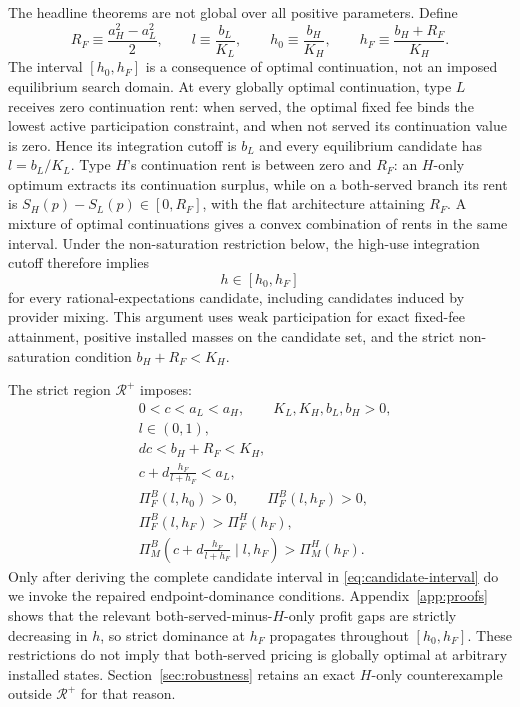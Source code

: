 The headline theorems are not global over all positive parameters. Define
\begin{equation}
 R_F\equiv\frac{a_H^2-a_L^2}{2},
 \qquad
 l\equiv\frac{b_L}{K_L},
 \qquad
 h_0\equiv\frac{b_H}{K_H},
 \qquad
 h_F\equiv\frac{b_H+R_F}{K_H}.
 \label{eq:state-definitions}
\end{equation}
The interval $[h_0,h_F]$ is a consequence of optimal continuation, not an imposed equilibrium search domain. At every globally optimal continuation, type $L$ receives zero continuation rent: when served, the optimal fixed fee binds the lowest active participation constraint, and when not served its continuation value is zero. Hence its integration cutoff is $b_L$ and every equilibrium candidate has $l=b_L/K_L$. Type $H$'s continuation rent is between zero and $R_F$: an $H$-only optimum extracts its continuation surplus, while on a both-served branch its rent is $S_H(p)-S_L(p)\in[0,R_F]$, with the flat architecture attaining $R_F$. A mixture of optimal continuations gives a convex combination of rents in the same interval. Under the non-saturation restriction below, the high-use integration cutoff therefore implies
\begin{equation}
 h\in[h_0,h_F]
 \label{eq:candidate-interval}
\end{equation}
for every rational-expectations candidate, including candidates induced by provider mixing. This argument uses weak participation for exact fixed-fee attainment, positive installed masses on the candidate set, and the strict non-saturation condition $b_H+R_F<K_H$.

The strict region $\mathcal R^+$ imposes:
\begin{align}
 &0<c<a_L<a_H,\qquad K_L,K_H,b_L,b_H>0,\label{eq:Rplus1}\\
 &l\in(0,1),\label{eq:Rplus2}\\
 &dc<b_H+R_F<K_H,\label{eq:Rplus3}\\
 &c+d\frac{h_F}{l+h_F}<a_L,\label{eq:Rplus4}\\
 &\Pi_F^B(l,h_0)>0,\qquad \Pi_F^B(l,h_F)>0,\label{eq:Rplus5}\\
 &\Pi_F^B(l,h_F)>\Pi_F^H(h_F),\label{eq:Rplus6}\\
 &\Pi_M^B\!\left(c+d\frac{h_F}{l+h_F}\mid l,h_F\right)>\Pi_M^H(h_F).\label{eq:Rplus7}
\end{align}
Only after deriving the complete candidate interval in \eqref{eq:candidate-interval} do we invoke the repaired endpoint-dominance conditions. Appendix~\ref{app:proofs} shows that the relevant both-served-minus-$H$-only profit gaps are strictly decreasing in $h$, so strict dominance at $h_F$ propagates throughout $[h_0,h_F]$. These restrictions do not imply that both-served pricing is globally optimal at arbitrary installed states. Section~\ref{sec:robustness} retains an exact $H$-only counterexample outside $\mathcal R^+$ for that reason.
